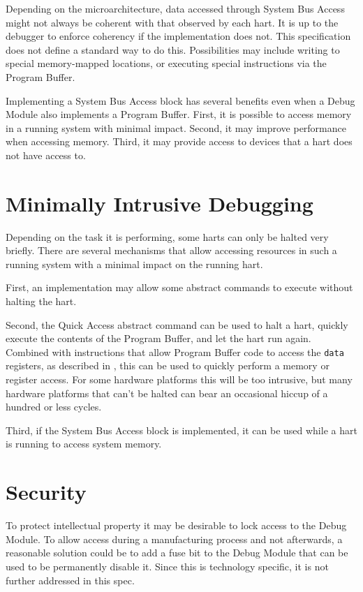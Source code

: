 Depending on the microarchitecture, data accessed through System Bus Access might
not always be coherent with that observed by each hart. It is up to the
debugger to enforce coherency if the implementation does not. This
specification does not define a standard way to do this.
Possibilities may include
writing to special memory-mapped
locations, or executing special instructions via the Program Buffer.

\begin{commentary}
Implementing a System Bus Access block has several benefits even
when a Debug Module also implements a Program Buffer.
First, it is possible to
access memory in a running system with minimal impact.  Second, it may improve
performance when accessing memory.
Third, it may provide
access to devices that a hart does not have access to.
\end{commentary}

\section{Minimally Intrusive Debugging}

Depending on the task it is performing, some harts can only be halted very briefly.
There are several mechanisms that allow accessing resources in such a running system
with a minimal impact on the running hart.

First, an implementation may allow some abstract commands to execute without halting the hart.

Second, the Quick Access abstract command can be used to halt a hart, quickly
execute the contents of the Program Buffer, and let the hart run again.
Combined with instructions that allow Program Buffer code to access the
{\tt data} registers, as described in \RdmHartinfo, this can be used to quickly
perform a memory or register access. For some hardware platforms this will be too
intrusive, but many hardware platforms that can't be halted can bear an occasional hiccup
of a hundred or less cycles.

Third, if the System Bus Access block is implemented, it can be used while a
hart is running to access system memory.

\section{Security}

To protect intellectual property it may be desirable to lock access to the
Debug Module.  To allow access during a manufacturing process and not
afterwards, a reasonable solution could be to add a fuse bit to the Debug
Module that can be used to be permanently disable it. Since this is technology
specific, it is not further addressed in this spec.

